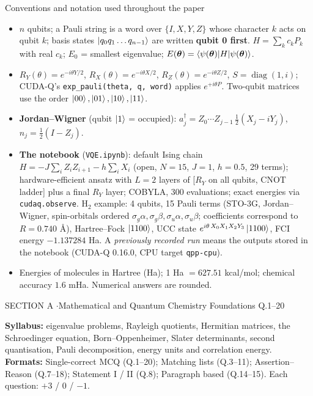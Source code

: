 \documentclass[11pt,a4paper]{article}
\begin{document}
\begin{infobox}{Conventions and notation used throughout the paper}
\small
\begin{itemize}[leftmargin=1.2em, itemsep=1pt, topsep=2pt]
\item $n$ qubits; a Pauli string is a word over $\{I, X, Y, Z\}$ whose character $k$ acts on qubit $k$; basis states $\ket{q_0q_1\dots q_{n-1}}$ are written
      \textbf{qubit 0 first}. $H = \sum_kc_kP_k$ with real $c_k$; $E_0$ = smallest eigenvalue; $E(\boldsymbol\theta) = \braket{\psi(\boldsymbol\theta)|H|\psi(\boldsymbol\theta)}$.
\item $R_Y(\theta) = e^{-i\theta Y/2}$, $R_X(\theta) = e^{-i\theta X/2}$, $R_Z(\theta) = e^{-i\theta Z/2}$, $S = \operatorname{diag}(1, i)$; CUDA-Q's \texttt{exp\_pauli(theta, q, word)} applies $e^{+i\theta P}$.
      Two-qubit matrices use the order $\ket{00}, \ket{01}, \ket{10}, \ket{11}$.
\item \textbf{Jordan--Wigner} (qubit $\ket1$ = occupied): $a_j^\dagger = Z_0\cdots Z_{j-1}\,\tfrac12(X_j - iY_j)$, $n_j = \tfrac12(I - Z_j)$.
\item \textbf{The notebook} (\texttt{VQE.ipynb}): default Ising chain $H = -J\sum_{i}Z_iZ_{i+1} - h\sum_iX_i$ (open, $N = 15$, $J = 1$, $h = 0.5$, 29 terms);
      hardware-efficient ansatz with $L = 2$ layers of [$R_Y$ on all qubits, CNOT ladder] plus a final $R_Y$ layer; COBYLA, 300 evaluations; exact
      energies via \texttt{cudaq.observe}. H$_2$ example: 4 qubits, 15 Pauli terms (STO-3G, Jordan--Wigner, spin-orbitals ordered $\sigma_g\alpha, \sigma_g\beta, \sigma_u\alpha, \sigma_u\beta$;
      coefficients correspond to $R = 0.740$ \AA), Hartree--Fock $\ket{1100}$, UCC state $e^{i\theta\,X_0X_1X_2Y_3}\ket{1100}$, FCI energy $-1.137284$ Ha.
      A \emph{previously recorded run} means the outputs stored in the notebook (CUDA-Q 0.16.0, CPU target \texttt{qpp-cpu}).
\item Energies of molecules in Hartree (Ha); 1 Ha $= 627.51$ kcal/mol; chemical accuracy $1.6$ mHa. Numerical answers are rounded.
\end{itemize}
\end{infobox}
\newpage

\begin{sectionbanner}SECTION A \enspace$\cdot$\enspace Mathematical and Quantum Chemistry Foundations \hfill Q.1--20\end{sectionbanner}

{\small \textbf{Syllabus:} eigenvalue problems, Rayleigh quotients, Hermitian matrices, the Schroedinger equation, Born--Oppenheimer, Slater determinants, second quantisation, Pauli decomposition, energy units and correlation energy.\\ \textbf{Formats:} Single-correct MCQ (Q.1--20); Matching lists (Q.3--11); Assertion--Reason (Q.7--18); Statement I / II (Q.8); Paragraph based (Q.14--15). Each question: $+3$ / $0$ / $-1$.}
\par\medskip
\end{document}
